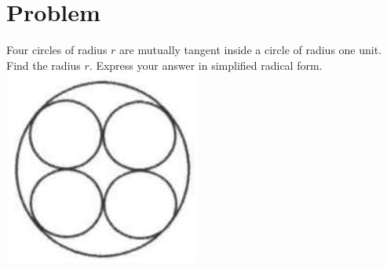 \documentclass{article}
\begin{document}
\section*{Problem}
Four circles of radius \(r\) are mutually tangent inside a circle of radius one unit. Find the radius \(r\). Express your answer in simplified radical form.\\
\centering
\includegraphics[width=\textwidth]{images/186.jpg}
\end{document}

